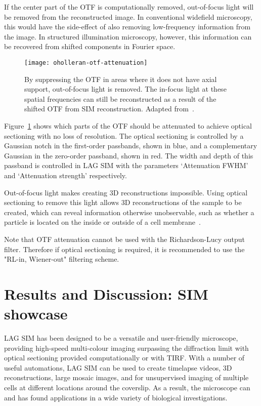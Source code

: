 If the center part of the OTF is computationally removed, out-of-focus light will be removed from the reconstructed image.
In conventional widefield microscopy, this would have the side-effect of also removing low-frequency information from the image. 
In structured illumination microscopy, however, this information can be recovered from shifted components in Fourier space. 

\begin{figure}[htbp!]
\centering
\texttt{[image: oholleran-otf-attenuation]}
\caption[LAG SIM: OTF attenuation]{By suppressing the OTF in areas where it does not have axial support, out-of-focus light is removed. The in-focus light at these spatial frequencies can still be reconstructed as a result of the shifted OTF from SIM reconstruction. Adapted from~\cite{oholleran2014optimized}. }
\label{fig:oholleran-otf}
\end{figure}

Figure~\ref{fig:oholleran-otf} shows which parts of the OTF should be attenuated to achieve optical sectioning with no loss of resolution. 
The optical sectioning is controlled by a Gaussian notch in the first-order passbands, shown in blue, and a complementary Gaussian in the zero-order passband, shown in red. 
The width and depth of this passband is controlled in LAG SIM with the parameters `Attenuation FWHM' and `Attenuation strength' respectively.


Out-of-focus light makes creating 3D reconstructions impossible. %
Using optical sectioning to remove this light allows 3D reconstructions of the sample to be created, which can reveal information otherwise unobservable, such as whether a particle is located on the inside or outside of a cell membrane~\cite{teplensky2017temperature}. 

Note that OTF attenuation cannot be used with the Richardson-Lucy output filter. 
Therefore if optical sectioning is required, it is recommended to use the "RL-in, Wiener-out" filtering scheme. 


\section{Results and Discussion: SIM showcase} \label{sec:sim-showcase}
LAG SIM has been designed to be a versatile and user-friendly microscope, providing high-speed multi-colour imaging surpassing the diffraction limit with optical sectioning provided computationally or with TIRF. 
With a number of useful automations, LAG SIM can be used to create timelapse videos, 3D reconstructions, large mosaic images, and for unsupervised imaging of multiple cells at different locations around the coverslip. 
As a result, the microscope can and has found applications in a wide variety of biological investigations.

